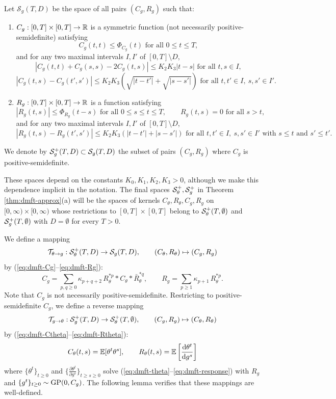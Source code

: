 \begin{definition}
Let $\mathcal{S}_g(T,D)$ be the space of all pairs
$(C_g,R_g)$ such that:
\begin{enumerate}
    \item $C_g:[0,T] \times [0,T] \to \mathbb{R}$ is a symmetric function (not necessarily
positive-semidefinite) satisfying
\[C_g(t,t) \leq \Phi_{C_g}(t) \text{ for all } 0\leq t\leq T,\]
and for any two maximal intervals $I,I'$ of $[0,T]\setminus D$,
        \begin{equation}\label{eq:Cg-cont1}
|C_g(t,t)+C_g(s,s)-2C_g(t,s)| \leq K_2K_3|t-s|
\text{ for all } t,s \in I,
\end{equation}
\begin{equation}\label{eq:Cg-cont2}
            |C_g(t,s)-C_g(t',s')| \leq K_2K_3(\sqrt{|t-t'|}+\sqrt{|s-s'|})
\text{ for all } t,t' \in I,~s,s' \in I'.
        \end{equation}
      \item $R_g:[0,T] \times [0,T] \to \mathbb{R}$ is a function satisfying
\[|R_g(t,s)| \leq \Phi_{R_g}(t-s) \text{ for all } 0 \leq s \leq t \leq T,
\qquad R_g(t,s)=0 \text{ for all } s>t,\]
and for any two maximal intervals $I,I'$ of $[0,T]\setminus D$,
\begin{equation}\label{eq:Rg-cont}
|R_g(t,s)-R_g(t',s')| \leq K_2K_3(|t-t'|+|s-s'|) \text{ for all } t,t'\in
I,~s,s'\in I' \text{ with } s\le t \text{ and } s'\le t'.
\end{equation}
\end{enumerate}
We denote by $\mathcal{S}_g^+(T,D) \subset \mathcal{S}_g(T,D)$
the subset of pairs $(C_g,R_g)$ where $C_g$ is positive-semidefinite.
\end{definition}

These spaces depend on the constants $K_0,K_1,K_2,K_3>0$, although we make this
dependence implicit in the notation. The final spaces $\mathcal{S}_\theta^+,\mathcal{S}_g^+$ in
Theorem \ref{thm:dmft-approx}(a) will be the spaces of kernels
$C_\theta,R_\theta,C_g,R_g$ on $[0,\infty) \times [0,\infty)$ whose restrictions
to $[0,T] \times [0,T]$
belong to $\mathcal{S}_\theta^+(T,\emptyset)$ and $\mathcal{S}_g^+(T,\emptyset)$ with
$D=\emptyset$ for every $T>0$.

We define a mapping
\[\mathcal{T}_{\theta \to g}:\mathcal{S}_\theta^+(T,D) \to \mathcal{S}_g(T,D),
\qquad (C_\theta,R_\theta) \mapsto (C_g,R_g)\]
by (\ref{eq:dmft-Cg}--\ref{eq:dmft-Rg}):
\[C_g=\sum_{p,q \geq 0} \kappa_{p+q+2}\,
R_\theta^{\ast p} * C_\theta * \bar R_\theta^{\ast q},
\qquad
R_g=\sum_{p \geq 1} \kappa_{p+1}\,R_\theta^{\ast p}.\]
Note that $C_g$ is not necessarily positive-semidefinite.
Restricting to positive-semidefinite $C_g$, we define a reverse mapping
\[\mathcal{T}_{g \to \theta}:\mathcal{S}_g^+(T,D) \to \mathcal{S}_\theta^+(T,\emptyset),
\qquad (C_g,R_g) \mapsto (C_\theta,R_\theta)\]
by (\ref{eq:dmft-Ctheta}--\ref{eq:dmft-Rtheta}):
\[C_\theta(t,s)=\mathbb{E}[\theta^t \theta^s],
\qquad R_\theta(t,s)=\mathbb{E}\left[\frac{\mathrm{d}\theta^t}{\mathrm{d} g^s}\right]\]
where $\{\theta^t\}_{t \geq 0}$ and $\{\frac{\partial \theta^t}{\partial
g^s}\}_{t \geq s \geq 0}$ solve (\ref{eq:dmft-theta}--\ref{eq:dmft-response})
with $R_g$ and $\{g^t\}_{t \geq 0} \sim \operatorname{GP}(0,C_g)$. The following lemma
verifies that these mappings are well-defined.

